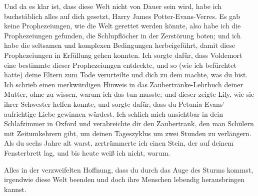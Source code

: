 \begin{writtenNote}
Und da es klar ist, dass diese Welt nicht von Dauer sein wird, habe ich buchstäblich alles auf dich gesetzt, Harry James Potter-Evans-Verres. Es gab keine Prophezeiungen, wie die Welt gerettet werden könnte, also habe ich die Prophezeiungen gefunden, die Schlupflöcher in der Zerstörung boten; und ich habe die seltsamen und komplexen Bedingungen herbeigeführt, damit diese Prophezeiungen in Erfüllung gehen konnten.
Ich sorgte dafür, dass Voldemort eine bestimmte dieser Prophezeiungen entdeckte, und so (wie ich befürchtet hatte) deine Eltern zum Tode verurteilte und dich zu dem machte, was du bist.
Ich schrieb einen merkwürdigen Hinweis in das Zaubertränke-Lehrbuch deiner Mutter, ohne zu wissen, warum ich das tun musste; und dieser zeigte Lily, wie sie ihrer Schwester helfen konnte, und sorgte dafür, dass du Petunia Evans' aufrichtige Liebe gewinnen würdest.
Ich schlich mich unsichtbar in dein Schlafzimmer in Oxford und verabreichte dir den Zaubertrank, den man Schülern mit Zeitumkehrern gibt, um deinen Tageszyklus um zwei Stunden zu verlängern.
Als du sechs Jahre alt warst, zertrümmerte ich einen Stein, der auf deinem Fensterbrett lag, und bis heute weiß ich nicht, warum.

Alles in der verzweifelten Hoffnung, dass du durch das Auge des Sturms kommst, irgendwie diese Welt beenden und doch ihre Menschen lebendig herausbringen kannst.


\end{writtenNote}
